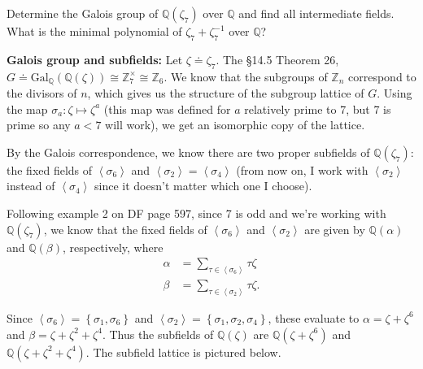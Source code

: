 \documentclass[twoside,10pt]{report}
\begin{document}
\newpage
\begin{exer}[]
	Determine the Galois group of $\mathbb{Q}(\zeta_{7})$ over $\mathbb{Q}$ and find all intermediate fields. What is the minimal polynomial of $\zeta_7+\zeta_7^{-1}$ over $\mathbb{Q}$?
\end{exer}
\textbf{Galois group and subfields:} Let $\zeta\doteq \zeta_{7}$. The \S 14.5 Theorem 26, $G \doteq \text{Gal}_{\mathbb{Q}}(\mathbb{Q}(\zeta))\cong \mathbb{Z}_{7}^{\times}\cong \mathbb{Z}_{6}$. We know that the subgroups of $\mathbb{Z}_n$ correspond to the divisors of $n$, which gives us the structure of the subgroup lattice of $G$. Using the map $\sigma_{a}: \zeta\mapsto \zeta^{a}$ (this map was defined for $a$ relatively prime to 7, but 7 is prime so any $a< 7$ will work), we get an isomorphic copy of the lattice.
\begin{center}
\end{center}
By the Galois correspondence, we know there are two proper subfields of $\mathbb{Q}(\zeta_{7})$: the fixed fields of $\left\langle \sigma_{6} \right\rangle$ and $\left\langle \sigma_{2} \right\rangle=\left\langle \sigma_{4} \right\rangle$ (from now on, I work with $\left\langle \sigma_2 \right\rangle$ instead of $\left\langle \sigma_4 \right\rangle$ since it doesn't matter which one I choose).

Following example 2 on DF page 597, since 7 is odd and we're working with $\mathbb{Q}(\zeta_7)$, we know that the fixed fields of $\left\langle \sigma_6 \right\rangle$ and $\left\langle \sigma_2 \right\rangle$ are given by $\mathbb{Q}(\alpha)$ and $\mathbb{Q}(\beta)$, respectively, where
\begin{align*}
	\alpha &= \sum_{\tau \in \left\langle \sigma_6 \right\rangle}\tau \zeta \\
	\beta &= \sum_{\tau \in \left\langle \sigma_2 \right\rangle}\tau \zeta .
\end{align*}

Since $\left\langle \sigma_6 \right\rangle= \left\{ \sigma_1,\sigma_6 \right\}$ and $\left\langle \sigma_2 \right\rangle=\left\{ \sigma_1,\sigma_2,\sigma_4 \right\}$, these evaluate to $\alpha = \zeta+\zeta^{6}$ and $\beta=\zeta+\zeta^{2}+\zeta^{4}$. Thus the subfields of $\mathbb{Q}(\zeta)$ are $\mathbb{Q}(\zeta+\zeta^{6})$ and $\mathbb{Q}(\zeta+\zeta^{2}+\zeta^{4})$. The subfield lattice is pictured below.
\end{document}
